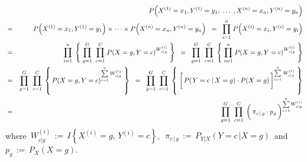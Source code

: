 \begin{eqnarray*}
&&
	P\!\left(X^{(1)} = x_{1},Y^{(1)}=y_{1}, \;\ldots\; ,X^{(n)} = x_{n},Y^{(n)}=y_{n}\right)
\\
&=&
	P\!\left(X^{(1)} = x_{1},Y^{(1)}=y_{1}\right) \times \cdots \times P\!\left(X^{(n)} = x_{n},Y^{(n)}=y_{n}\right)
\;\;=\;\;
	\overset{n}{\underset{i=1}{\prod}} \; P\!\left(X^{(i)} = x_{i},Y^{(i)}=y_{i}\right)
\\
&=&
	\overset{n}{\underset{i=1}{\prod}} \;
	\left\{\;
		\overset{G}{\underset{g=1}{\prod}} \;\;
		\overset{C}{\underset{c=1}{\prod}} \;
		P\!\left(X = g,Y=c\right)^{W^{(i)}_{c \vert g}}
	\;\right\}
\;\;=\;\;
	\overset{G}{\underset{g=1}{\prod}} \;\;
	\overset{C}{\underset{c=1}{\prod}} \;
	\left\{\;
		\overset{n}{\underset{i=1}{\prod}} \;
		P\!\left(X = g,Y=c\right)^{W^{(i)}_{c \vert g}}
	\;\right\}
\\
&=&
	\overset{G}{\underset{g=1}{\prod}} \;\;
	\overset{C}{\underset{c=1}{\prod}} \;
	\left\{\,
		P\!\left(X = g,Y=c\right)^{\overset{n}{\underset{i=1}{\sum}}\;W^{(i)}_{c \vert g}}
	\;\right\}
\;\;=\;\;
	\overset{G}{\underset{g=1}{\prod}} \;\;
	\overset{C}{\underset{c=1}{\prod}} \;
	\left\{\;
		\left[\,P\!\left(\left.Y=c\;\right\vert X = g\right) \overset{{\color{white}\vert}}{\cdot} P\!\left(X=g\right)\,\right]
		^{\overset{n}{\underset{i=1}{\sum}}\;W^{(i)}_{c \vert g}}
	\;\right\}
\\
&=&
	\overset{G}{\underset{g=1}{\prod}} \;\;
	\overset{C}{\underset{c=1}{\prod}} \;
	\left(\,\pi_{c\,\vert\,g} \overset{{\color{white}\vert}}{\cdot} p_{g}\,\right)
	^{\overset{n}{\underset{i=1}{\sum}}\,W^{(i)}_{c \vert g}}
\end{eqnarray*}
where
\,$W^{(i)}_{c \vert g} \,:=\, I\!\left\{X^{(i)}=g,\,Y^{(i)}=c\right\}$,\,
\,$\pi_{c\,\vert\,g} \,:=\, P_{Y \vert X}\!\left(\left.Y = c \,\right\vert X = g\right)$\,
and
\,$p_{g} \,:=\, P_{X}\!\left(X = g\right)$.\,
